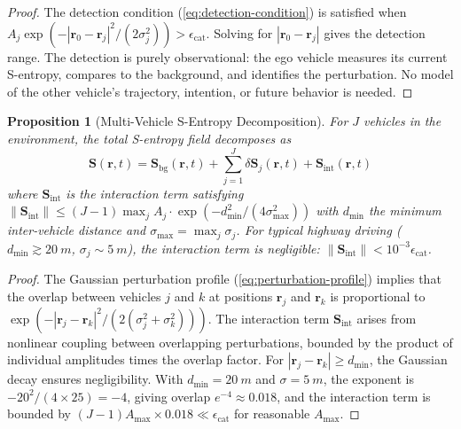\documentclass[twocolumn,10pt]{article}
\newtheorem{proposition}[theorem]{Proposition}
\theoremstyle{definition}
\theoremstyle{remark}
\newcommand{\Sent}{\mathbf{S}}
\begin{document}
\begin{proof}
The detection condition (\ref{eq:detection-condition}) is satisfied when
$A_j \exp(-|\mathbf{r}_0 - \mathbf{r}_j|^2 / (2\sigma_j^2)) >
\epsilon_{\mathrm{cat}}$. Solving for $|\mathbf{r}_0 - \mathbf{r}_j|$
gives the detection range. The detection is purely observational: the ego
vehicle measures its current S-entropy, compares to the background, and
identifies the perturbation. No model of the other vehicle's trajectory,
intention, or future behavior is needed.
\end{proof}

\begin{proposition}[Multi-Vehicle S-Entropy Decomposition]\label{prop:multi-vehicle}
For $J$ vehicles in the environment, the total S-entropy field decomposes as
\begin{equation}\label{eq:multi-decomposition}
  \Sent(\mathbf{r}, t) = \Sent_{\mathrm{bg}}(\mathbf{r}, t)
  + \sum_{j=1}^{J} \delta \Sent_j(\mathbf{r}, t)
  + \Sent_{\mathrm{int}}(\mathbf{r}, t)
\end{equation}
where $\Sent_{\mathrm{int}}$ is the interaction term satisfying
$\|\Sent_{\mathrm{int}}\| \leq (J-1) \max_j A_j \cdot
\exp(-d_{\min}^2 / (4\sigma_{\max}^2))$ with $d_{\min}$ the minimum
inter-vehicle distance and $\sigma_{\max} = \max_j \sigma_j$. For
typical highway driving ($d_{\min} \gtrsim \SI{20}{m}$,
$\sigma_j \sim \SI{5}{m}$), the interaction term is negligible:
$\|\Sent_{\mathrm{int}}\| < 10^{-3} \epsilon_{\mathrm{cat}}$.
\end{proposition}

\begin{proof}
The Gaussian perturbation profile (\ref{eq:perturbation-profile})
implies that the overlap between vehicles $j$ and $k$ at positions
$\mathbf{r}_j$ and $\mathbf{r}_k$ is proportional to
$\exp(-|\mathbf{r}_j - \mathbf{r}_k|^2 / (2(\sigma_j^2 + \sigma_k^2)))$.
The interaction term $\Sent_{\mathrm{int}}$ arises from nonlinear
coupling between overlapping perturbations, bounded by the product
of individual amplitudes times the overlap factor. For
$|\mathbf{r}_j - \mathbf{r}_k| \geq d_{\min}$, the Gaussian decay
ensures negligibility. With $d_{\min} = \SI{20}{m}$ and
$\sigma = \SI{5}{m}$, the exponent is $-20^2/(4 \times 25) = -4$,
giving overlap $e^{-4} \approx 0.018$, and the interaction term is
bounded by $(J-1) A_{\max} \times 0.018 \ll \epsilon_{\mathrm{cat}}$
for reasonable $A_{\max}$.
\end{proof}
\end{document}
